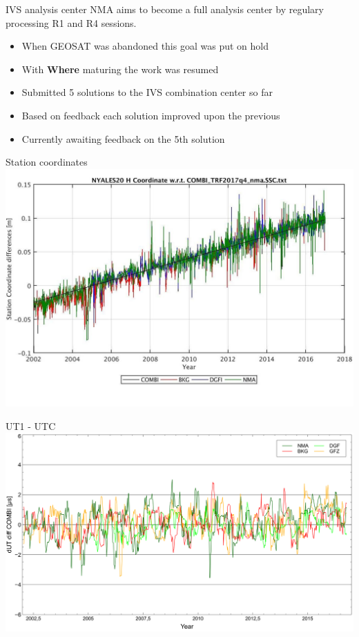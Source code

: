 \documentclass[14pt,c]{beamer}
\begin{document}
\begin{frame}{IVS analysis center}
NMA aims to become a full analysis center by regulary processing R1 and R4 sessions.

\begin{itemize}
  \item When GEOSAT was abandoned this goal was put on hold
  \item With \textbf{Where} maturing the work was resumed
  \item Submitted 5 solutions to the IVS combination center so far
  \item Based on feedback each solution improved upon the previous
  \item Currently awaiting feedback on the 5th solution
\end{itemize}
\end{frame}

\begin{frame}{Station coordinates}
  \includegraphics[width=\linewidth]{figure/NYALES20-H_diff-trf}
\end{frame}

\begin{frame}{UT1 - UTC}
  \includegraphics[width=\linewidth]{figure/dut_nma_diff_combi}
\end{frame}
\end{document}
